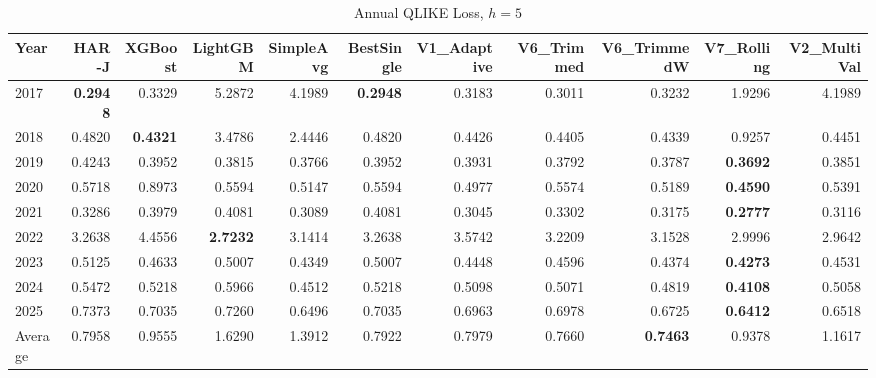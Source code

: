 \begin{table}[htbp]
\centering
\caption{Annual QLIKE Loss, $h=5$}
\label{tab:qlike_annual_h5}
\begin{tabular}{lrrrrrrrrrr}
\toprule
Year & HAR-J & XGBoost & LightGBM & SimpleAvg & BestSingle & V1\_Adaptive & V6\_Trimmed & V6\_TrimmedW & V7\_Rolling & V2\_MultiVal \\
\midrule
2017 & \textbf{0.2948} & 0.3329 & 5.2872 & 4.1989 & \textbf{0.2948} & 0.3183 & 0.3011 & 0.3232 & 1.9296 & 4.1989 \\
2018 & 0.4820 & \textbf{0.4321} & 3.4786 & 2.4446 & 0.4820 & 0.4426 & 0.4405 & 0.4339 & 0.9257 & 0.4451 \\
2019 & 0.4243 & 0.3952 & 0.3815 & 0.3766 & 0.3952 & 0.3931 & 0.3792 & 0.3787 & \textbf{0.3692} & 0.3851 \\
2020 & 0.5718 & 0.8973 & 0.5594 & 0.5147 & 0.5594 & 0.4977 & 0.5574 & 0.5189 & \textbf{0.4590} & 0.5391 \\
2021 & 0.3286 & 0.3979 & 0.4081 & 0.3089 & 0.4081 & 0.3045 & 0.3302 & 0.3175 & \textbf{0.2777} & 0.3116 \\
2022 & 3.2638 & 4.4556 & \textbf{2.7232} & 3.1414 & 3.2638 & 3.5742 & 3.2209 & 3.1528 & 2.9996 & 2.9642 \\
2023 & 0.5125 & 0.4633 & 0.5007 & 0.4349 & 0.5007 & 0.4448 & 0.4596 & 0.4374 & \textbf{0.4273} & 0.4531 \\
2024 & 0.5472 & 0.5218 & 0.5966 & 0.4512 & 0.5218 & 0.5098 & 0.5071 & 0.4819 & \textbf{0.4108} & 0.5058 \\
2025 & 0.7373 & 0.7035 & 0.7260 & 0.6496 & 0.7035 & 0.6963 & 0.6978 & 0.6725 & \textbf{0.6412} & 0.6518 \\
\midrule
Average & 0.7958 & 0.9555 & 1.6290 & 1.3912 & 0.7922 & 0.7979 & 0.7660 & \textbf{0.7463} & 0.9378 & 1.1617 \\
\bottomrule
\end{tabular}
\end{table}